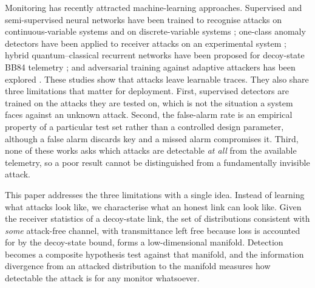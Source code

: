 \documentclass[11pt,a4paper]{article}
\theoremstyle{definition}
\theoremstyle{remark}
\begin{document}
Monitoring has recently attracted machine-learning approaches. Supervised and semi-supervised neural networks have been trained to recognise attacks on continuous-variable systems \cite{Mao2020,Luo2022} and on discrete-variable systems \cite{XuJ2024,AlMohammed2021,Ren2021}; one-class anomaly detectors have been applied to receiver attacks on an experimental system \cite{Liu2025AD}; hybrid quantum--classical recurrent networks have been proposed for decoy-state BB84 telemetry \cite{AlKuwari2025}; and adversarial training against adaptive attackers has been explored \cite{MohamedAlKuwari2026}. These studies show that attacks leave learnable traces. They also share three limitations that matter for deployment. First, supervised detectors are trained on the attacks they are tested on, which is not the situation a system faces against an unknown attack. Second, the false-alarm rate is an empirical property of a particular test set rather than a controlled design parameter, although a false alarm discards key and a missed alarm compromises it. Third, none of these works asks which attacks are detectable \emph{at all} from the available telemetry, so a poor result cannot be distinguished from a fundamentally invisible attack.

This paper addresses the three limitations with a single idea. Instead of learning what attacks look like, we characterise what an honest link can look like. Given the receiver statistics of a decoy-state link, the set of distributions consistent with \emph{some} attack-free channel, with transmittance left free because loss is accounted for by the decoy-state bound, forms a low-dimensional manifold. Detection becomes a composite hypothesis test against that manifold, and the information divergence from an attacked distribution to the manifold measures how detectable the attack is for any monitor whatsoever.
\end{document}
